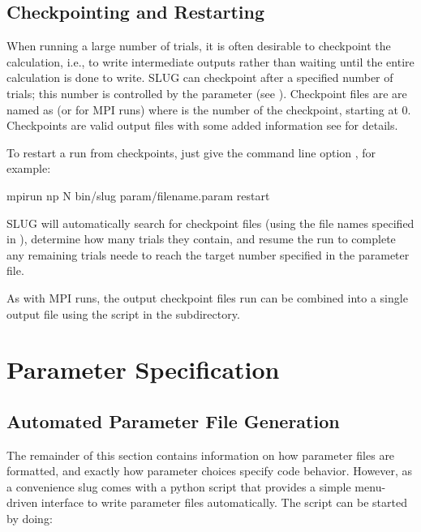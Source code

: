 \documentclass[letterpaper,10pt,english]{sphinxmanual}
\begin{document}
\section{Checkpointing and Restarting}
\label{\detokenize{running:checkpointing-and-restarting}}
When running a large number of trials, it is often desirable to checkpoint the calculation, i.e., to write intermediate outputs rather than waiting until the entire calculation is done to write. SLUG can checkpoint after a specified number of trials; this number is controlled by the  parameter (see {\hyperref[\detokenize{parameters:sec-parameters}]{}}). Checkpoint files are are named as  (or  for MPI runs) where  is the number of the checkpoint, starting at 0. Checkpoints are valid output files with some added information \textendash{} see {\hyperref[\detokenize{output:ssec-checkpoint-files}]{}} for details.

To restart a run from checkpoints, just give the command line option , for example:

\begin{sphinxVerbatim}[commandchars=\\\{\}]
mpirun \PYGZhy{}np N bin/slug param/filename.param \PYGZhy{}\PYGZhy{}restart
\end{sphinxVerbatim}

SLUG will automatically search for checkpoint files (using the file names specified in ), determine how many trials they contain, and resume the run to complete any remaining trials neede to reach the target number specified in the parameter file.

As with MPI runs, the output checkpoint files run can be combined into a single output file using the  script in the  subdirectory.


\chapter{Parameter Specification}
\label{\detokenize{parameters:sec-parameters}}\label{\detokenize{parameters::doc}}\label{\detokenize{parameters:parameter-specification}}

\section{Automated Parameter File Generation}
\label{\detokenize{parameters:automated-parameter-file-generation}}
The remainder of this section contains information on how parameter files are formatted, and exactly how parameter choices specify code behavior. However, as a convenience slug comes with a python script that provides a simple menu-driven interface to write parameter files automatically. The script can be started by doing:
\end{document}

